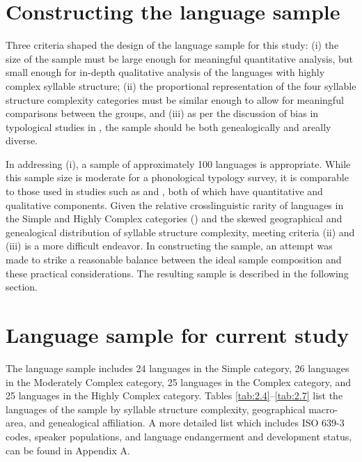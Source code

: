 \section{Constructing the language sample}\label{sec:2.3}

  Three criteria shaped the design of the language sample for this study: (i) the size of the sample must be large enough for meaningful quantitative analysis, but small enough for in-depth qualitative analysis of the languages with highly complex syllable structure; (ii) the proportional representation of the four syllable structure complexity categories must be similar enough to allow for meaningful comparisons between the groups, and (iii) as per the discussion of bias in typological studies in , the sample should be both genealogically and areally diverse.

  In addressing (i), a sample of approximately 100 languages is appropriate. While this sample size is moderate for a phonological typology survey, it is comparable to those used in studies such as \citet{Bateman2007} and \citet{BybeeEasterday2019}, both of which have quantitative and qualitative components. Given the relative crosslinguistic rarity of languages in the Simple and Highly Complex categories () and the skewed geographical and genealogical distribution of syllable structure complexity, meeting criteria (ii) and (iii) is a more difficult endeavor. In constructing the sample, an attempt was made to strike a reasonable balance between the ideal sample composition and these practical considerations. The resulting sample is described in the following section.
 
\section{Language sample for current study}\label{sec:2.4}

  The language sample includes 24 languages in the Simple category, 26 languages in the Moderately Complex category, 25 languages in the Complex category, and 25 languages in the Highly Complex category. Tables \ref{tab:2.4}--\ref{tab:2.7} list the languages of the sample by syllable structure complexity, geographical macro-area, and genealogical affiliation. A more detailed list which includes ISO 639-3 codes, speaker populations, and language endangerment and development status, can be found in Appendix A.

